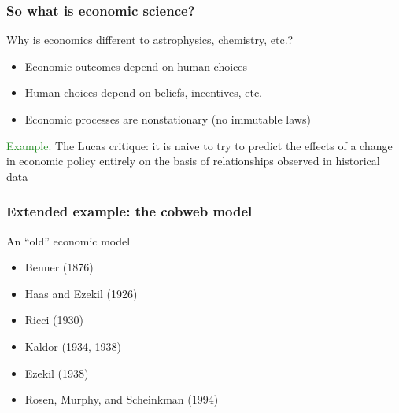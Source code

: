 \documentclass[
    xcolor={svgnames,dvipsnames},
    hyperref={colorlinks, citecolor=DeepPink4, linkcolor=DarkRed, urlcolor=DarkBlue}
    ]{beamer}  %
\newcommand{\Eg}{\textcolor{ForestGreen}{Example. }}
\newcommand{\1}{\mathbbm 1}
\begin{document}
\begin{frame}
    \frametitle{So what is economic science?}

    Why is economics different to astrophysics, chemistry, etc.?

    \begin{itemize}
        \item Economic outcomes depend on human choices
            \vspace{0.3em}
        \item Human choices depend on beliefs, incentives, etc.
            \vspace{0.3em}
        \item Economic processes are nonstationary (no immutable laws)
    \end{itemize}

            \vspace{0.3em}
            \vspace{0.3em}
            \vspace{0.3em}

    \Eg The Lucas critique: it is naive to try to predict the effects
        of a change in economic policy entirely on the basis of relationships
        observed in historical data

\end{frame}

\begin{frame}
    \frametitle{Extended example: the cobweb model}

    An ``old'' economic model

    \begin{itemize}
        \item Benner (1876)
        \item Haas and Ezekil (1926)
        \item Ricci (1930)
        \item Kaldor (1934, 1938)
        \item Ezekil (1938)
        \item Rosen, Murphy, and Scheinkman (1994)
    \end{itemize}

\end{frame}
\end{document}
